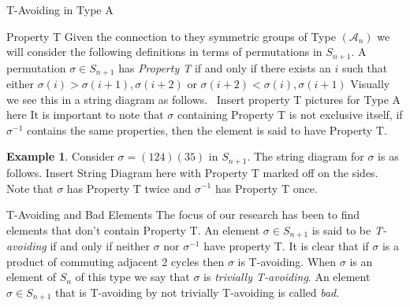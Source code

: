 \documentclass[11pt]{amsart}
\theoremstyle{definition}
\newtheorem{example}[theorem]{Example}
\numberwithin{equation}{section}
\newcommand{\A}{\mathcal{A}}
\renewcommand{\(}{\left(}
\renewcommand{\)}{\right)}
\begin{document}
\begin{section}{T-Avoiding in Type A}
\begin{subsection}{Property T}
Given the connection to they symmetric groups of Type $(\A_n)$ we will consider the following definitions in terms of permutations in $S_{n+1}$. A permutation $\sigma \in S_{n+1}$ has \emph{Property T} if and only if there exists an $i$ such that either $\sigma(i)>\sigma(i+1), \sigma(i+2)$ or $\sigma(i+2)<\sigma(i),\sigma(i+1)$ Visually we see this in a string diagram as follows.~{\color{red} Insert property T pictures for Type A here} It is important to note that $\sigma$ containing Property T is not exclusive itself, if $\sigma^{-1}$ contains the same properties, then the element is said to have Property T.
\begin{example}
Consider $\sigma=(124)(35)$ in $S_{n+1}$. The string diagram for $\sigma$ is as follows. {\color{red} Insert String Diagram here with Property T marked off on the sides}. Note that $\sigma$ has Property T twice and $\sigma^{-1}$ has Property T once.	
\end{example}
\end{subsection}

\begin{subsection}{T-Avoiding and Bad Elements}
The focus of our research has been to find elements that don't contain Property T. An element $\sigma \in S_{n+1}$ is said to be \emph{T-avoiding} if and only if neither $\sigma$ nor $\sigma^{-1}$ have property T.	It is clear that if $\sigma$ is a product of commuting adjacent 2 cycles then $\sigma$ is T-avoiding. When $\sigma$ is an element of $S_n$ of this type we say that $\sigma$ is \emph{trivially T-avoiding}. An element $\sigma \in S_{n+1}$ that is T-avoiding by not trivially T-avoiding is called \emph{bad}. 
\end{subsection}


\end{section}
\end{document}
